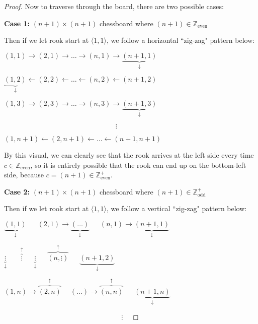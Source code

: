 \documentclass[12pt]{article}
\begin{document}
\begin{enumerate}[label=Part \Alph*)]
\begin{proof}[Proof]
         Now to traverse through the board, there are two possible cases:
        
        \textbf{Case 1:} $(n + 1) \times (n + 1)$ chessboard where $(n + 1) \in \mathbb{Z}_{\text{even}}$
        
        Then if we let rook start at $\langle 1, 1 \rangle $, we follow a horizontal ``zig-zag" pattern below:
        
        $(1, 1) \rightarrow (2, 1) \rightarrow \ldots \rightarrow (n, 1) \rightarrow \underbrace{(n + 1, 1)}_{\downarrow}$
        
		$\underbrace{(1, 2)}_{\downarrow} \leftarrow (2, 2) \leftarrow \ldots \leftarrow  (n, 2) \leftarrow (n + 1, 2)$
		
		$(1, 3) \rightarrow (2, 3) \rightarrow \ldots \rightarrow  (n, 3) \rightarrow \underbrace{(n + 1, 3)}_{\downarrow}$
		
		$\hspace{190pt}\vdots\hspace{11pt}$
		
		$(1, n + 1) \leftarrow (2, n + 1) \leftarrow \ldots \leftarrow (n + 1, n + 1)$
		
		By this visual, we can clearly see that the rook arrives at the left side every time $c \in \mathbb{Z}_{\text{even}}$, so it is entirely possible that the rook can end up on the bottom-left side, because $c = (n + 1) \in \mathbb{Z}_{\text{even}}^{+}$.
 
        \textbf{Case 2:} $(n + 1) \times (n + 1)$ chessboard where $(n + 1) \in \mathbb{Z}_{\text{odd}}^{+}$
        
        Then if we let rook start at $\langle 1, 1 \rangle $, we follow a vertical ``zig-zag" pattern below:
        
        $\underbrace{(1, 1)}_{\downarrow} \quad\;\; (2, 1) \rightarrow \underbrace{(\ldots)}_{\downarrow} \quad\;\; (n, 1) \rightarrow \underbrace{(n + 1, 1)}_{\downarrow}$
        
		$\underbrace{\vdots}_{\downarrow} \quad\quad \overbrace{\vdots}^{\uparrow} \quad\;\; \underbrace{\vdots}_{\downarrow} \quad\;\;  \overbrace{(n, \vdots )}^{\uparrow} \quad\;\; \underbrace{(n + 1, 2)}_{\downarrow}$
		
		$(1, n) \rightarrow \overbrace{(2, n)}^{\uparrow} \quad\; (\ldots) \rightarrow \overbrace{(n, n)}^{\uparrow} \quad\;\; \underbrace{(n + 1, n)}_{\downarrow}$
		
		$\hspace{200pt}\vdots\hspace{11pt}$
		

\end{proof}
\end{enumerate}
\end{document}
